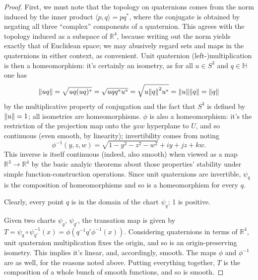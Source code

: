 \documentclass{article}
\newtheorem{plm}{Problem}
\begin{document}
\begin{proof}
  First, we must note that the topology on quaternions comes from the norm induced by the inner product $\langle p, q \rangle = pq^{*}$,
  where the conjugate is obtained by negating all three ``complex'' components of a quaternion.
  This agrees with the topology induced as a subspace of $\mathbb{R}^{4}$, because writing out the norm yields exactly that of Euclidean space;
  we may abusively regard sets and maps in the quaternions in either context, as convenient.
  Unit quaternion (left-)multiplication is then a homeomorphism: it's certainly an isometry,
  as for all $u \in S^{3}$ and $q \in \mathbb{H}$ one has
  \[
    \norm{uq} = \sqrt{uq(uq)^{*}} = \sqrt{uqq^{*}u^{*}} = \sqrt{u\norm{q}^{2}u^{*}} = \norm{u}\norm{q} = \norm{q}
  \]
  by the multiplicative property of conjugation and the fact that $S^{3}$ is defined by $\norm{u} = 1$;
  all isometries are homeomorphisms.
  $\phi$ is also a homeomorphism: it's the restriction of the projection map onto the $yzw$ hyperplane to $U$,
  and so continuous (even smooth, by linearity); invertibility comes from noting
  \[
    \phi^{-1}(y, z, w) = \sqrt{1 - y^{2} - z^{2} - w^{2}} + iy + jz + kw.
  \]
  This inverse is itself continuous (indeed, also smooth) when viewed as a map $\mathbb{R}^{3} \to \mathbb{R}^{4}$
  by the basic analyic theorems about those properties' stability under simple function-construction operations.
  Since unit quaternions are invertible, $\psi_{q}$ is the composition of homeomorphisms and so is a homeomorphism for every $q$.

  Clearly, every point $q$ is in the domain of the chart $\psi_{q}$; 1 is positive.

  Given two charts $\psi_{q}$, $\psi_{q'}$, the transation map is given by $T = \psi_{q} \circ \psi_{q'}^{-1}(x) = \phi(q^{-1}q'\phi^{-1}(x))$.
  Considering quaternions in terms of $\mathbb{R}^{4}$, unit quaternion multiplication fixes the origin, and so is an origin-preserving isometry.
  This implies it's linear, and, accordingly, smooth.
  The maps $\phi$ and $\phi^{-1}$ are as well, for the reasons noted above.
  Putting everything together, $T$ is the composition of a whole bunch of smooth functions, and so is smooth.
\end{proof}

\end{document}
